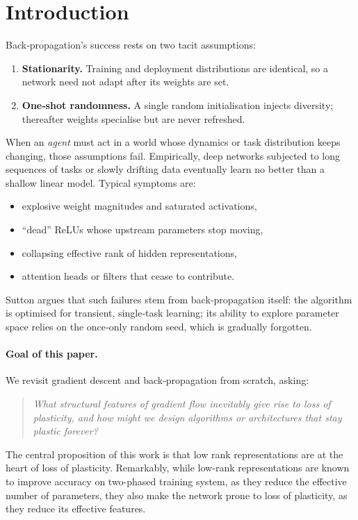 \documentclass[11pt]{article}
\begin{document}
\section{Introduction}
Back‑propagation’s success rests on two tacit assumptions:
\begin{enumerate}
    \item \textbf{Stationarity.}  Training and deployment distributions are identical, so a network need not adapt after its weights are set.
    \item \textbf{One‑shot randomness.}  A single random initialisation injects diversity; thereafter weights specialise but are never refreshed.
\end{enumerate}
When an \emph{agent} must act in a world whose dynamics or task distribution keeps changing, those assumptions fail.  
Empirically, deep networks subjected to long sequences of tasks or slowly drifting data eventually learn no better than a shallow linear model.  
Typical symptoms are:
\begin{itemize}[nosep]
    \item explosive weight magnitudes and saturated activations,
    \item “dead” ReLUs whose upstream parameters stop moving,
    \item collapsing effective rank of hidden representations,
    \item attention heads or filters that cease to contribute.
\end{itemize}
Sutton argues that such failures stem from back‑propagation itself: the algorithm is optimised for transient, single‑task learning; its ability to explore parameter space relies on the once‑only random seed, which is gradually forgotten. 

\paragraph{Goal of this paper.}
We revisit gradient descent and back‑propagation from scratch, asking:

\begin{quote}
\emph{What structural features of gradient flow inevitably give rise to loss of plasticity, and how might we design algorithms or architectures that stay plastic forever?}
\end{quote}

The central proposition of this work is that low rank representations are at the heart of loss of plasticity. Remarkably, while low-rank representations are known to improve accuracy on two-phased training system, as they reduce the effective number of parameters, they also make the network prone to loss of plasticity, as they reduce its effective features. 
\end{document}
